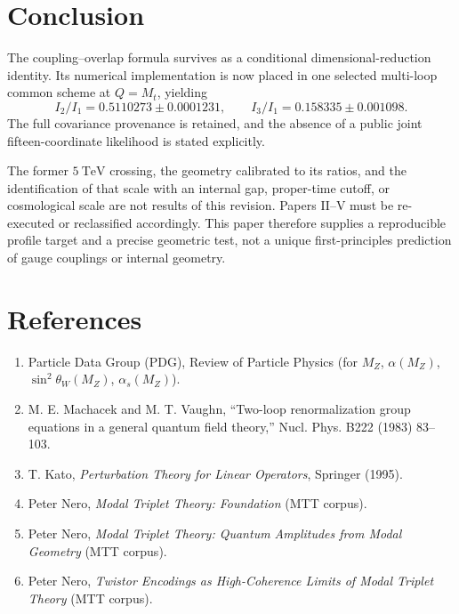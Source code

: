\documentclass[11pt]{article}
\begin{document}
\section{Conclusion}

The coupling--overlap formula survives as a conditional dimensional-reduction
identity.  Its numerical implementation is now placed in one selected
multi-loop common scheme at $Q=M_t$, yielding
\[
 I_2/I_1=0.5110273\pm0.0001231,\qquad
 I_3/I_1=0.158335\pm0.001098.
\]
The full covariance provenance is retained, and the absence of a public joint
fifteen-coordinate likelihood is stated explicitly.

The former $5~\mathrm{TeV}$ crossing, the geometry calibrated to its ratios,
and the identification of that scale with an internal gap, proper-time cutoff,
or cosmological scale are not results of this revision.  Papers II--V must be
re-executed or reclassified accordingly.  This paper therefore supplies a
reproducible profile target and a precise geometric test, not a unique
first-principles prediction of gauge couplings or internal geometry.

\section*{References}

\begin{enumerate}
\item Particle Data Group (PDG), Review of Particle Physics (for $M_Z$, $\alpha(M_Z)$, $\sin^2\theta_W(M_Z)$, $\alpha_s(M_Z)$).
\item M. E. Machacek and M. T. Vaughn, ``Two-loop renormalization group equations in a general quantum field theory,'' Nucl. Phys. B222 (1983) 83--103.  %
\item T. Kato, \emph{Perturbation Theory for Linear Operators}, Springer (1995). %
\item Peter Nero, \emph{Modal Triplet Theory: Foundation} (MTT corpus).
\item Peter Nero, \emph{Modal Triplet Theory: Quantum Amplitudes from Modal Geometry} (MTT corpus).
\item Peter Nero, \emph{Twistor Encodings as High-Coherence Limits of Modal Triplet Theory} (MTT corpus).
\end{enumerate}
\end{document}
